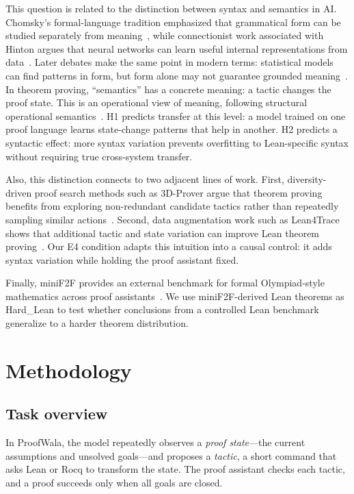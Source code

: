 \documentclass{article} %
\begin{document}
This question is related to the distinction between syntax and semantics in AI.  Chomsky's formal-language tradition emphasized that grammatical form can be studied separately from meaning~\citep{chomsky1957syntactic}, while connectionist work associated with Hinton argues that neural networks can learn useful internal representations from data~\citep{rumelhart1986learning}.  Later debates make the same point in modern terms: statistical models can find patterns in form, but form alone may not guarantee grounded meaning~\citep{norvig2011chomsky,bender2020climbing}.  In theorem proving, ``semantics'' has a concrete meaning: a tactic changes the proof state.  This is an operational view of meaning, following structural operational semantics~\citep{plotkin1981structural}.  H1 predicts transfer at this level: a model trained on one proof language learns state-change patterns that help in another.  H2 predicts a syntactic effect: more syntax variation prevents overfitting to Lean-specific syntax without requiring true cross-system transfer.

Also, this distinction connects to two adjacent lines of work.  First, diversity-driven proof search methods such as 3D-Prover argue that theorem proving benefits from exploring non-redundant candidate tactics rather than repeatedly sampling similar actions~\citep{lamont2024diversity}.  Second, data augmentation work such as Lean4Trace shows that additional tactic and state variation can improve Lean theorem proving~\citep{nesterov2024lean4trace}.  Our E4 condition adapts this intuition into a causal control: it adds syntax variation while holding the proof assistant fixed.

Finally, miniF2F provides an external benchmark for formal Olympiad-style mathematics across proof assistants~\citep{zheng2021minif2f}.  We use miniF2F-derived Lean theorems as Hard\_Lean to test whether conclusions from a controlled Lean benchmark generalize to a harder theorem distribution.


\section{Methodology}
\label{sec:methodology}

\subsection{Task overview}
\label{subsec:task-overview}

In ProofWala, the model repeatedly observes a \emph{proof state}---the current
assumptions and unsolved goals---and proposes a \emph{tactic}, a short command
that asks Lean or Rocq to transform the state.  The proof assistant checks each
tactic, and a proof succeeds only when all goals are closed.
\end{document}
